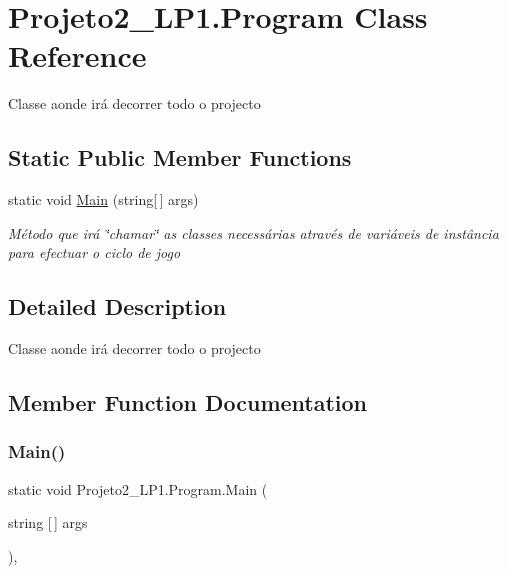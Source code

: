 \hypertarget{class_projeto2___l_p1_1_1_program}{}\section{Projeto2\+\_\+\+L\+P1.\+Program Class Reference}
\label{class_projeto2___l_p1_1_1_program}


Classe aonde irá decorrer todo o projecto  


\subsection*{Static Public Member Functions}
\begin{DoxyCompactItemize}
\item 
static void \mbox{\hyperlink{class_projeto2___l_p1_1_1_program_aba70a3fe408854c8240fe5c9c48d09f4}{Main}} (string\mbox{[}$\,$\mbox{]} args)
\begin{DoxyCompactList}\small\item\em Método que irá \char`\"{}chamar\char`\"{} as classes necessárias através de variáveis de instância para efectuar o ciclo de jogo \end{DoxyCompactList}\end{DoxyCompactItemize}


\subsection{Detailed Description}
Classe aonde irá decorrer todo o projecto 



\subsection{Member Function Documentation}
\mbox{\label{class_projeto2___l_p1_1_1_program_aba70a3fe408854c8240fe5c9c48d09f4}} 
\subsubsection{\texorpdfstring{Main()}{Main()}}
{\footnotesize\ttfamily static void Projeto2\+\_\+\+L\+P1.\+Program.\+Main (\begin{DoxyParamCaption}\item[{string \mbox{[}$\,$\mbox{]}}]{args }\end{DoxyParamCaption})\hspace{0.3cm}{\ttfamily [inline]}, {\ttfamily [static]}}



